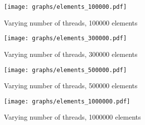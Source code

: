 \documentclass[a4paper]{article}
\begin{document}
\begin{thebibliography}{}
\begin{figure}[H]
    \texttt{[image: graphs/elements\_100000.pdf]}
    \caption{Varying number of threads, 100000 elements}
    \label{fig:elements_100000}
\end{figure}
\begin{figure}[H]
    \texttt{[image: graphs/elements\_300000.pdf]}
    \caption{Varying number of threads, 300000 elements}
    \label{fig:elements_300000}
\end{figure}
\begin{figure}[H]
    \texttt{[image: graphs/elements\_500000.pdf]}
    \caption{Varying number of threads, 500000 elements}
    \label{fig:elements_500000}
\end{figure}
\begin{figure}[H]
    \texttt{[image: graphs/elements\_1000000.pdf]}
    \caption{Varying number of threads, 1000000 elements}
    \label{fig:elements_1000000}
\end{figure}

\end{thebibliography}
\end{document}
